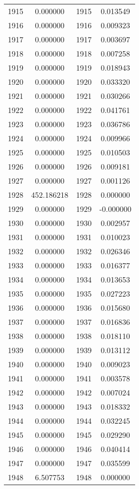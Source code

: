 \documentclass[12pt]{article}
\begin{document}
\begin{longtable}{@{}cccc@{}}
1915 & 0.000000 & 1915 & 0.013549 \\
1916 & 0.000000 & 1916 & 0.009323 \\
1917 & 0.000000 & 1917 & 0.003697 \\
1918 & 0.000000 & 1918 & 0.007258 \\
1919 & 0.000000 & 1919 & 0.018943 \\
1920 & 0.000000 & 1920 & 0.033320 \\
1921 & 0.000000 & 1921 & 0.030266 \\
1922 & 0.000000 & 1922 & 0.041761 \\
1923 & 0.000000 & 1923 & 0.036786 \\
1924 & 0.000000 & 1924 & 0.009966 \\
1925 & 0.000000 & 1925 & 0.010503 \\
1926 & 0.000000 & 1926 & 0.009181 \\
1927 & 0.000000 & 1927 & 0.001126 \\
1928 & 452.186218 & 1928 & 0.000000 \\
1929 & 0.000000 & 1929 & -0.000000 \\
1930 & 0.000000 & 1930 & 0.002957 \\
1931 & 0.000000 & 1931 & 0.010023 \\
1932 & 0.000000 & 1932 & 0.026346 \\
1933 & 0.000000 & 1933 & 0.016377 \\
1934 & 0.000000 & 1934 & 0.013653 \\
1935 & 0.000000 & 1935 & 0.027223 \\
1936 & 0.000000 & 1936 & 0.015680 \\
1937 & 0.000000 & 1937 & 0.016836 \\
1938 & 0.000000 & 1938 & 0.018110 \\
1939 & 0.000000 & 1939 & 0.013112 \\
1940 & 0.000000 & 1940 & 0.009023 \\
1941 & 0.000000 & 1941 & 0.003578 \\
1942 & 0.000000 & 1942 & 0.007024 \\
1943 & 0.000000 & 1943 & 0.018332 \\
1944 & 0.000000 & 1944 & 0.032245 \\
1945 & 0.000000 & 1945 & 0.029290 \\
1946 & 0.000000 & 1946 & 0.040414 \\
1947 & 0.000000 & 1947 & 0.035599 \\
1948 & 6.507753 & 1948 & 0.000000 \\

\end{longtable}
\end{document}
